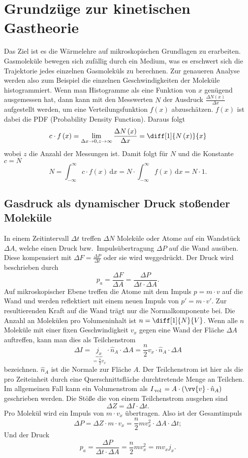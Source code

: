 \documentclass[a4paper,12pt]{article}
\newcommand{\td}{\,\text{d}}
\begin{document}
\section{Grundzüge zur kinetischen Gastheorie}
Das Ziel ist es die Wärmelehre auf mikroskopischen Grundlagen zu erarbeiten. Gasmoleküle bewegen sich zufällig durch ein Medium, was es erschwert sich die Trajektorie jedes einzelnen Gasmoleküls zu berechnen. Zur genaueren Analyse werden also zum Beispiel die einzelnen Geschwindigkeiten der Moleküle histogrammiert. Wenn man Histogramme als eine Funktion von $x$ genügend ausgemessen hat, dann kann mit den Messwerten $N$ der Ausdruck $\tfrac{\Delta N\left(x\right)}{\Delta x}$ aufgestellt werden, um eine Verteilungsfunktion $f\left(x\right)$ abzuschätzen. $f\left(x\right)$ ist dabei die PDF (Probability Density Function). Daraus folgt
\[ 
        c\cdot f\left(x\right)=\lim_{\Delta x\rightarrow 0,z\rightarrow \infty}\dfrac{\Delta N\left(x\right)}{\Delta x}=\diff[1]{N\left(x\right)}{x}
\] 
wobei $z$ die Anzahl der Messungen ist. Damit folgt für $N$ und die Konstante $c=N$ 
\[ 
        N=\int_{-\infty}^{\infty}c\cdot f\left(x\right)\td x=N\cdot \int_{-\infty}^{\infty}f\left(x\right)\td x=N\cdot 1
.\] 

\subsection{Gasdruck als dynamischer Druck stoßender Moleküle}
In einem Zeitintervall $\Delta t$ treffen $\Delta N$ Moleküle oder Atome auf ein Wandstück $\Delta A$, welche einen Druck bzw.\, Impulsübertragung $\Delta P$ auf die Wand ausüben. Diese kompensiert mit $\Delta F=\tfrac{\Delta P}{\Delta t}$ oder sie wird weggedrückt. Der Druck wird beschrieben durch
\[ 
        p_a=\dfrac{\Delta F}{\Delta A}=\dfrac{\Delta P}{\Delta t\cdot \Delta A}
.\] 
Auf mikroskopischer Ebene treffen die Atome mit dem Impuls $p=m\cdot v$ auf die Wand und werden reflektiert mit einem neuen Impuls von $p'=m\cdot v'$. Zur resultierenden Kraft auf die Wand trägt nur die Normalkomponente bei. Die Anzahl an Molekülen pro Volumeninhalt ist $n=\diff[1]{N}{V}$. Wenn alle $n$ Moleküle mit einer fixen Geschwindigkeit $v_x$ gegen eine Wand der Fläche $\Delta A$ auftreffen, kann man dies als Teilchenstrom 
\[ 
        \Delta I=\underbrace{j_x}_{=\tfrac{n}{2}v_x}\cdot \hat{n}_A\cdot \Delta A=\dfrac{n}{2}v_x\cdot \hat{n}_A\cdot \Delta A
\] 
bezeichnen. $\hat{n}_A$ ist die Normale zur Fläche $A$. Der Teilchenstrom ist hier als die pro Zeiteinheit durch eine Querschnittsfläche durchtretende Menge an Teilchen. Im allgemeinen Fall kann ein Volumenstrom als $I_{\,\text{vol}\,}=A\cdot \left(\vv{v}\cdot \hat{n}_A\right)$ geschrieben werden. Die Stöße die von einem Teilchenstrom ausgehen sind
\[ 
        \Delta Z=\Delta I\cdot \Delta t
.\] 
Pro Molekül wird ein Impuls von $m\cdot v_x$ übertragen. Also ist der Gesamtimpuls
\[ 
        \Delta P=\Delta Z\cdot m\cdot v_x=\dfrac{n}{2}mv_x^2\cdot \Delta A\cdot \Delta t
;\] 
Und der Druck
\[ 
        p_a=\dfrac{\Delta P}{\Delta t\cdot \Delta A}=\dfrac{n}{2}mv_x^2=mv_xj_x
.\] 
\end{document}
